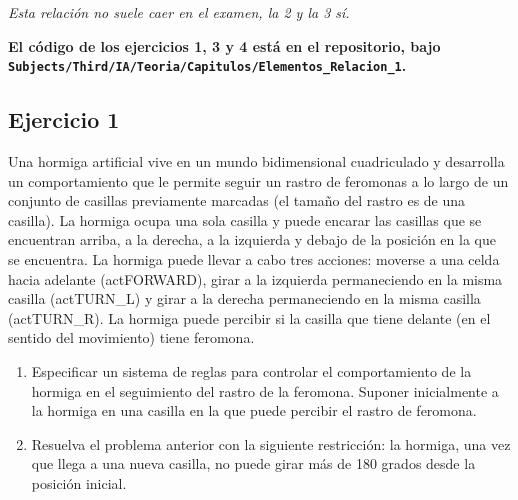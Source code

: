 \begin{tcolorbox}[colback=green!5!white, colframe=green!75!black]
\textit{Esta relación no suele caer en el examen, la 2 y la 3 sí.}
\end{tcolorbox}

\textbf{El código de los ejercicios 1, 3 y 4 está en el repositorio, bajo
\texttt{Subjects/Third/IA/Teoria/Capitulos/Elementos\_Relacion\_1}.}

\subsection*{Ejercicio 1}

Una hormiga artificial vive en un mundo bidimensional cuadriculado y desarrolla un 
comportamiento  que  le  permite  seguir  un  rastro  de  feromonas  a  lo  largo  de  un  conjunto  de 
casillas  previamente  marcadas  (el  tamaño  del  rastro  es  de  una  casilla).  La  hormiga  ocupa  una 
sola casilla y puede encarar las casillas que se encuentran arriba, a la derecha, a la izquierda y 
debajo  de  la  posición  en  la  que  se  encuentra.  La  hormiga  puede  llevar  a  cabo  tres  acciones: 
moverse a una celda hacia adelante (actFORWARD), girar a la izquierda permaneciendo en la 
misma casilla (actTURN\_L) y girar a la derecha permaneciendo en la misma casilla 
(actTURN\_R).  La  hormiga  puede  percibir  si  la  casilla  que  tiene  delante  (en  el  sentido  del 
movimiento) tiene feromona.

\begin{enumerate}
    \item Especificar  un  sistema  de  reglas  para  controlar  el  comportamiento  de  la  hormiga  en  el 
    seguimiento del rastro de la feromona. Suponer inicialmente a la hormiga en una casilla en 
    la que puede percibir el rastro de feromona.
    \item Resuelva el problema anterior con la siguiente restricción: la hormiga, una vez que llega a 
    una nueva casilla, no puede girar más de 180 grados desde la posición inicial.
\end{enumerate}

